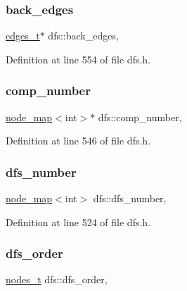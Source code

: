 \subsubsection{\texorpdfstring{back\+\_\+edges}{back\_edges}}
{\footnotesize\ttfamily \mbox{\hyperlink{edge_8h_a8f9587479bda6cf612c103494b3858e3}{edges\+\_\+t}}$\ast$ dfs\+::back\+\_\+edges\hspace{0.3cm}{\ttfamily [protected]}, {\ttfamily [inherited]}}



Definition at line 554 of file dfs.\+h.

\mbox{\label{classdfs_a00db016ac7eab69045cae408008890c1}} 
\subsubsection{\texorpdfstring{comp\+\_\+number}{comp\_number}}
{\footnotesize\ttfamily \mbox{\hyperlink{classnode__map}{node\+\_\+map}}$<$int$>$$\ast$ dfs\+::comp\+\_\+number\hspace{0.3cm}{\ttfamily [protected]}, {\ttfamily [inherited]}}



Definition at line 546 of file dfs.\+h.

\mbox{\label{classdfs_a99727f2274d6af63daae4f0518f3adbe}} 
\subsubsection{\texorpdfstring{dfs\+\_\+number}{dfs\_number}}
{\footnotesize\ttfamily \mbox{\hyperlink{classnode__map}{node\+\_\+map}}$<$int$>$ dfs\+::dfs\+\_\+number\hspace{0.3cm}{\ttfamily [protected]}, {\ttfamily [inherited]}}



Definition at line 524 of file dfs.\+h.

\mbox{\label{classdfs_af70a73ace68afd91ef944f984c9f28d5}} 
\subsubsection{\texorpdfstring{dfs\+\_\+order}{dfs\_order}}
{\footnotesize\ttfamily \mbox{\hyperlink{edge_8h_a22ac17689106ba21a84e7bc54d1199d6}{nodes\+\_\+t}} dfs\+::dfs\+\_\+order\hspace{0.3cm}{\ttfamily [protected]}, {\ttfamily [inherited]}}




